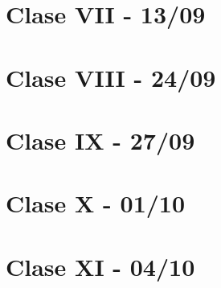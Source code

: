\documentclass[12pt,a4paper]{book}
\begin{document}
\chapter{Clase VII - 13/09}

\newpage\thispagestyle{empty}\blankpage
\chapter{Clase VIII - 24/09}

\newpage\thispagestyle{empty}\blankpage
\chapter{Clase IX - 27/09}

\newpage\thispagestyle{empty}\blankpage
\chapter{Clase X - 01/10}

\newpage\thispagestyle{empty}\blankpage
\chapter{Clase XI - 04/10}



\blankpage



\nocite{*}
\end{document}
